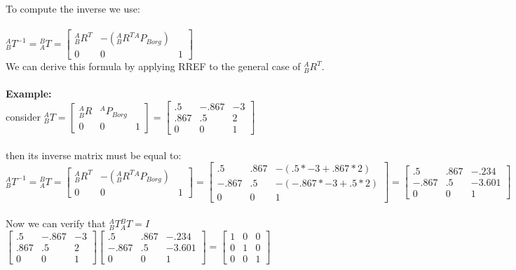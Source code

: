 \documentclass{article}
\begin{document}
To compute the inverse we use: \\\\
${}^A_B T^{-1}={}^B_A T=\begin{bmatrix}
{}^A_B R^T & -({}^A_B R^T {}^A P_{Borg}) \\
0 & 0 & 1
\end{bmatrix}$\\
We can derive this formula by applying RREF to the general case of ${}^A_B R^T$. \\\\
\textbf{Example: }\\
consider ${}^A_B T = \begin{bmatrix}
{}^A_B R & {}^A P_{Borg}\\
0 & 0 & 1
\end{bmatrix}=\begin{bmatrix}
.5 & -.867 & -3 \\
.867 & .5 & 2 \\
0 & 0 & 1
\end{bmatrix}$ \\\\
then its inverse matrix must be equal to:\\
${}^A_B T^{-1}={}^B_A T=\begin{bmatrix}
{}^A_B R^T & -({}^A_B R^T {}^A P_{Borg}) \\
0 & 0 & 1
\end{bmatrix}=\begin{bmatrix}
.5 &.867 & -(.5*-3 +.867*2 )\\
-.867 & .5 & -(-.867*-3 + .5*2) \\
0 & 0 & 1
\end{bmatrix}=\begin{bmatrix}
.5 &.867 & -.234 \\
-.867 & .5 & -3.601\\
0 & 0 & 1
\end{bmatrix}$\\\\
Now we can verify that ${}^A_B T {}^B_A T = I$ \\
$\begin{bmatrix}
.5 & -.867 & -3 \\
.867 & .5 & 2 \\
0 & 0 & 1
\end{bmatrix}
\begin{bmatrix}
.5 &.867 & -.234 \\
-.867 & .5 & -3.601\\
0 & 0 & 1
\end{bmatrix}=\begin{bmatrix}
1 & 0 & 0 \\
0 & 1 & 0 \\
0 & 0 & 1
\end{bmatrix}$
\end{document}
